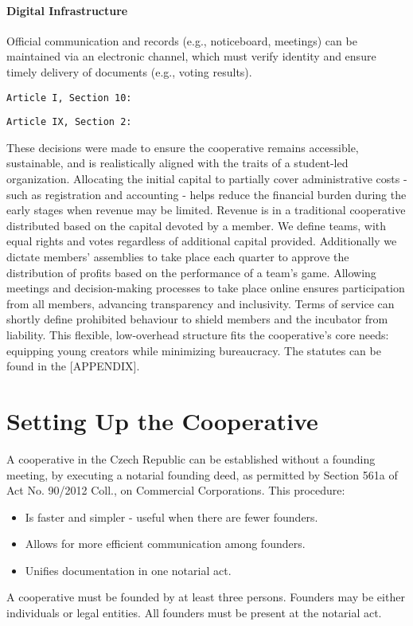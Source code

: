 \paragraph{Digital Infrastructure}
Official communication and records (e.g., noticeboard, meetings) can be maintained via an electronic channel, which must verify identity and ensure timely delivery of documents (e.g., voting results).

\texttt{Article I, Section 10: }

\texttt{Article IX, Section 2: }

These decisions were made to ensure the cooperative remains accessible, sustainable, and is realistically aligned with the traits of a student-led organization. Allocating the initial capital to partially cover administrative costs - such as registration and accounting - helps reduce the financial burden during the early stages when revenue may be limited. Revenue is in a traditional cooperative distributed based on the capital devoted by a member. We define teams, with equal rights and votes regardless of additional capital provided. Additionally we dictate members’ assemblies to take place each quarter to approve the distribution of profits  based on the performance of a team’s game. Allowing meetings and decision-making processes to take place online ensures participation from all members, advancing transparency and inclusivity. Terms of service can shortly define prohibited behaviour to shield members and the incubator from liability. This flexible, low-overhead structure fits the cooperative's core needs: equipping young creators while minimizing bureaucracy. The statutes can be found in the [APPENDIX].

\section{Setting Up the Cooperative}
A cooperative in the Czech Republic can be established without a founding meeting, by executing a notarial founding deed, as permitted by Section 561a of Act No. 90/2012 Coll., on Commercial Corporations. This procedure:
\begin{itemize}
    \item Is faster and simpler - useful when there are fewer founders.
    \item Allows for more efficient communication among founders.
    \item Unifies documentation in one notarial act.
\end{itemize}
A cooperative must be founded by at least three persons. Founders may be either individuals or legal entities. All founders must be present at the notarial act.

